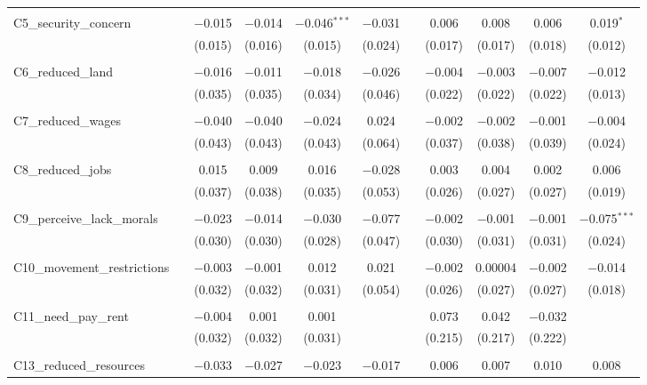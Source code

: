\begin{table}[H]
\begin{tabular}{@{\extracolsep{4pt}}lcccccccccc}
  & & & & & & & & & & \\ 
 C5\_security\_concern &  & $-$0.015 & $-$0.014 & $-$0.046$^{***}$ & $-$0.031 &  & 0.006 & 0.008 & 0.006 & 0.019$^{*}$ \\ 
  &  & (0.015) & (0.016) & (0.015) & (0.024) &  & (0.017) & (0.017) & (0.018) & (0.012) \\ 
  & & & & & & & & & & \\ 
 C6\_reduced\_land &  & $-$0.016 & $-$0.011 & $-$0.018 & $-$0.026 &  & $-$0.004 & $-$0.003 & $-$0.007 & $-$0.012 \\ 
  &  & (0.035) & (0.035) & (0.034) & (0.046) &  & (0.022) & (0.022) & (0.022) & (0.013) \\ 
  & & & & & & & & & & \\ 
 C7\_reduced\_wages &  & $-$0.040 & $-$0.040 & $-$0.024 & 0.024 &  & $-$0.002 & $-$0.002 & $-$0.001 & $-$0.004 \\ 
  &  & (0.043) & (0.043) & (0.043) & (0.064) &  & (0.037) & (0.038) & (0.039) & (0.024) \\ 
  & & & & & & & & & & \\ 
 C8\_reduced\_jobs &  & 0.015 & 0.009 & 0.016 & $-$0.028 &  & 0.003 & 0.004 & 0.002 & 0.006 \\ 
  &  & (0.037) & (0.038) & (0.035) & (0.053) &  & (0.026) & (0.027) & (0.027) & (0.019) \\ 
  & & & & & & & & & & \\ 
 C9\_perceive\_lack\_morals &  & $-$0.023 & $-$0.014 & $-$0.030 & $-$0.077 &  & $-$0.002 & $-$0.001 & $-$0.001 & $-$0.075$^{***}$ \\ 
  &  & (0.030) & (0.030) & (0.028) & (0.047) &  & (0.030) & (0.031) & (0.031) & (0.024) \\ 
  & & & & & & & & & & \\ 
 C10\_movement\_restrictions &  & $-$0.003 & $-$0.001 & 0.012 & 0.021 &  & $-$0.002 & 0.00004 & $-$0.002 & $-$0.014 \\ 
  &  & (0.032) & (0.032) & (0.031) & (0.054) &  & (0.026) & (0.027) & (0.027) & (0.018) \\ 
  & & & & & & & & & & \\ 
 C11\_need\_pay\_rent &  & $-$0.004 & 0.001 & 0.001 &  &  & 0.073 & 0.042 & $-$0.032 &  \\ 
  &  & (0.032) & (0.032) & (0.031) &  &  & (0.215) & (0.217) & (0.222) &  \\ 
  & & & & & & & & & & \\ 
 C13\_reduced\_resources &  & $-$0.033 & $-$0.027 & $-$0.023 & $-$0.017 &  & 0.006 & 0.007 & 0.010 & 0.008 \\ 

\end{tabular}
\end{table}
